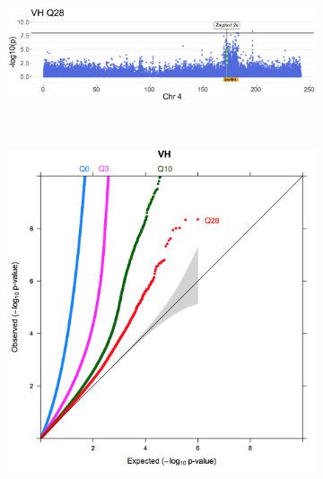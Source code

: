 \documentclass[10pt,letterpaper]{article}
\begin{document}
\begin{figure}[p]
\begin{subfigure}[b]{\textwidth}
   \includegraphics[width=\linewidth]{fig6b.png}
    \caption{}
\end{subfigure} 
\\[\baselineskip]
\begin{subfigure}[t]{0.45\textwidth}
   \includegraphics[width=\linewidth]{fig6c.png}  
    \caption{}    
\end{subfigure}
\hfill
\begin{subfigure}[t]{0.45\textwidth}

\end{subfigure}
\end{figure}
\end{document}
